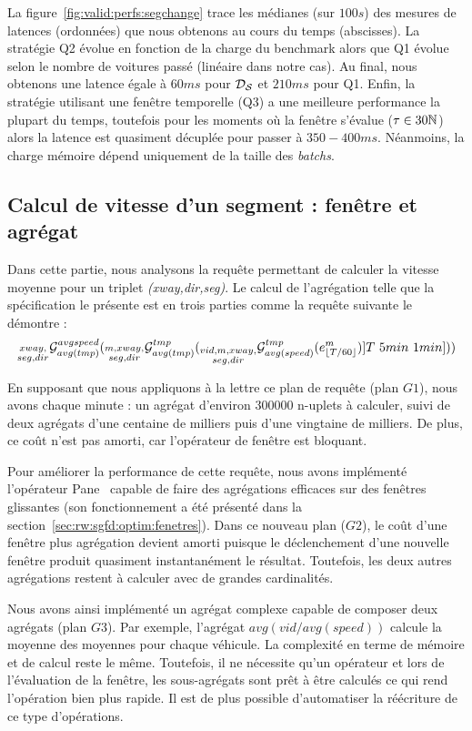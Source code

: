 La figure~\ref{fig:valid:perfs:segchange} trace les médianes (sur $100s$) des mesures de latences (ordonnées) que nous obtenons au cours du temps (abscisses). La stratégie Q2 évolue en fonction de la charge du benchmark alors que Q1 évolue selon le nombre de voitures passé (linéaire dans notre cas). Au final, nous obtenons une latence égale à $60ms$ pour $\mathcal{D_S}$ et $210ms$ pour Q1. Enfin, la stratégie utilisant une fenêtre temporelle (Q3) a une meilleure performance la plupart du temps, toutefois pour les moments où la fenêtre s'évalue ($\tau\in 30\mathbb{N}$) alors la latence est quasiment décuplée pour passer à $350-400ms$. Néanmoins, la charge mémoire dépend uniquement de la taille des \textit{batchs}.

\subsection{Calcul de vitesse d'un segment : fenêtre et agrégat}\label{sec:valid:perfs:flux:avg}
Dans cette partie, nous analysons la requête permettant de calculer la vitesse moyenne pour un triplet \textit{(xway,dir,seg)}. Le calcul de l'agrégation telle que la spécification le présente est en trois parties comme la requête suivante le démontre :
$$\null_{\substack{xway,\\ seg,dir}}\G_{avg(tmp)}^{avgspeed}(\null_{\substack{m,xway,\\ seg,dir}}\G_{avg(tmp)}^{tmp}(\null_{\substack{vid,m,xway,\\ seg,dir}}\G_{avg(speed)}^{tmp} (e_{\lfloor T/60 \rfloor}^{m})]T\ 5min\ 1min]))$$

En supposant que nous appliquons à la lettre ce plan de requête (plan $G1$), nous avons chaque minute : un agrégat d'environ 300000 n-uplets à calculer, suivi de deux agrégats d'une centaine de milliers puis d'une vingtaine de milliers. De plus, ce coût n'est pas amorti, car l'opérateur de fenêtre est bloquant.

Pour améliorer la performance de cette requête, nous avons implémenté l'opérateur Pane~\cite{Li:pane} capable de faire des agrégations efficaces sur des fenêtres glissantes (son fonctionnement a été présenté dans la section~\ref{sec:rw:sgfd:optim:fenetres}). Dans ce nouveau plan ($G2$), le coût d'une fenêtre plus agrégation devient amorti puisque le déclenchement d'une nouvelle fenêtre produit quasiment instantanément le résultat. Toutefois, les deux autres agrégations restent à calculer avec de grandes cardinalités.

Nous avons ainsi implémenté un agrégat complexe capable de composer deux agrégats (plan $G3$). Par exemple, l'agrégat $avg(vid/avg(speed))$ calcule la moyenne des moyennes pour chaque véhicule. La complexité en terme de mémoire et de calcul reste le même. Toutefois, il ne nécessite qu'un opérateur et lors de l'évaluation de la fenêtre, les sous-agrégats sont prêt à être calculés ce qui rend l'opération bien plus rapide. Il est de plus possible d'automatiser la réécriture de ce type d'opérations.

